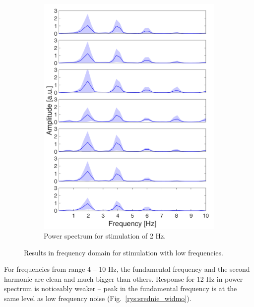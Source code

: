 \documentclass{pracalicmgr}
\begin{document}
\begin{figure}[H]
\begin{subfigure}{.5\textwidth}
		\includegraphics[width=1.\linewidth]{widmo_2Hz.png}
		\caption{Power spectrum for stimulation of 2 Hz.}
		\label{rys:widmo_2Hz}
    	\end{subfigure}
    	\caption{Results in frequency domain for stimulation with low frequencies.}
    	\label{rys:widmo_1_2}
    \end{figure}
    
    For frequencies from range 4 -- 10 Hz, the fundamental frequency and the second harmonic are clean and much bigger than others. Response for 12 Hz in power spectrum is noticeably weaker -- peak in the fundamental frequency is at the same level as low frequency noise (Fig.~\ref{rys:srednie_widmo}).
    
\end{document}
